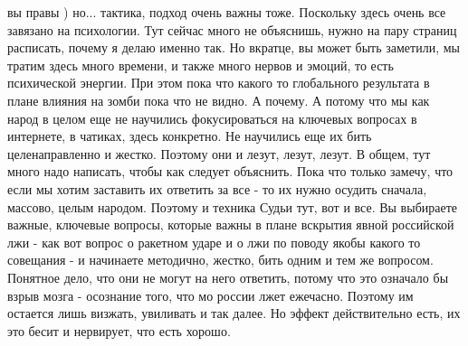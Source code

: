 вы правы ) но... тактика, подход очень важны тоже. Поскольку здесь очень все
завязано на психологии. Тут сейчас много не объяснишь, нужно на пару страниц
расписать, почему я делаю именно так. Но вкратце, вы может быть заметили, мы
тратим здесь много времени, и также много нервов и эмоций, то есть психической
энергии. При этом пока что какого то глобального результата в плане влияния на
зомби пока что не видно. А почему. А потому что мы как народ в целом еще не
научились фокусироваться на ключевых вопросах в интернете, в чатиках, здесь
конкретно. Не научились еще их бить целенаправленно и жестко. Поэтому они и
лезут, лезут, лезут. В общем, тут много надо написать, чтобы как следует
объяснить. Пока что только замечу, что если мы хотим заставить их ответить за
все - то их нужно осудить сначала, массово, целым народом. Поэтому и техника
Судьи тут, вот и все. Вы выбираете важные, ключевые вопросы, которые важны в
плане вскрытия явной российской лжи - как вот вопрос о ракетном ударе и о лжи
по поводу якобы какого то совещания - и начинаете методично, жестко, бить одним
и тем же вопросом. Понятное дело, что они не могут на него ответить, потому что
это означало бы взрыв мозга - осознание того, что мо россии лжет ежечасно.
Поэтому им остается лишь визжать, увиливать и так далее. Но эффект
действительно есть, их это бесит и нервирует, что есть хорошо.
